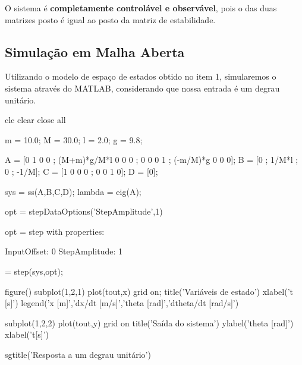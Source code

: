 \documentclass[a4paper, 12pt]{article}
\begin{document}
O sistema é \textbf{completamente controlável e observável}, pois o das duas matrizes posto é igual ao posto da matriz de estabilidade.



\subsection{Simulação em Malha Aberta}

Utilizando o modelo de espaço de estados obtido no item 1, simularemos o sistema através do MATLAB, considerando que nossa entrada é um degrau unitário.

\sloppy
{}
\graphicspath{ {./malhaaberta_images/} }


\begin{matlabcode}
clc
clear
close all

\end{matlabcode}


\begin{matlabcode}

m = 10.0;
M = 30.0;
l = 2.0;
g = 9.8;

\end{matlabcode}


\begin{matlabcode}

A = [0 1 0 0 ; (M+m)*g/M*l 0 0 0 ; 0 0 0 1 ; (-m/M)*g 0 0 0];
B = [0 ; 1/M*l ; 0 ; -1/M];
C = [1 0 0 0 ; 0 0 1 0];
D = [0];

sys = ss(A,B,C,D);
lambda = eig(A);

\end{matlabcode}


\begin{matlabcode}

opt = stepDataOptions('StepAmplitude',1)
\end{matlabcode}
\begin{matlaboutput}
opt = 
  step with properties:

      InputOffset: 0
    StepAmplitude: 1

\end{matlaboutput}
\begin{matlabcode}
[y,tout,x] = step(sys,opt);

figure()
subplot(1,2,1)
plot(tout,x) 
grid on;
title('Variáveis de estado')
xlabel('t [s]')
legend('x [m]','dx/dt [m/s]','theta [rad]','dtheta/dt [rad/s]')

subplot(1,2,2)
plot(tout,y)
grid on
title('Saída do sistema')
ylabel('theta [rad]')
xlabel('t[s]')

sgtitle('Resposta a um degrau unitário')
\end{matlabcode}
\end{document}
